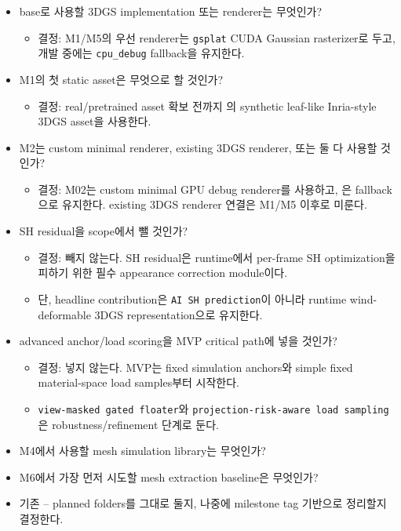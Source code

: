 \documentclass[10pt]{article}
\newcommand{\done}{\textcolor{DoneGreen}{\(\boxtimes\)}}
\newcommand{\code}[1]{\texttt{#1}}
\begin{document}
\begin{itemize}
  \item[\done] base로 사용할 3DGS implementation 또는 renderer는 무엇인가?
    \begin{itemize}
      \item 결정: M1/M5의 우선 renderer는 \code{gsplat} CUDA Gaussian rasterizer로 두고, 개발 중에는 \code{cpu\_debug} fallback을 유지한다.
    \end{itemize}
  \item[\done] M1의 첫 static asset은 무엇으로 할 것인가?
    \begin{itemize}
      \item 결정: real/pretrained asset 확보 전까지 의 synthetic leaf-like Inria-style 3DGS asset을 사용한다.
    \end{itemize}
  \item[\done] M2는 custom minimal renderer, existing 3DGS renderer, 또는 둘 다 사용할 것인가?
    \begin{itemize}
      \item 결정: M02는 custom minimal GPU debug renderer를 사용하고, 은 fallback으로 유지한다. existing 3DGS renderer 연결은 M1/M5 이후로 미룬다.
    \end{itemize}
  \item[\done] SH residual을 scope에서 뺄 것인가?
    \begin{itemize}
      \item 결정: 빼지 않는다. SH residual은 runtime에서 per-frame SH optimization을 피하기 위한 필수 appearance correction module이다.
      \item 단, headline contribution은 \code{AI SH prediction}이 아니라 runtime wind-deformable 3DGS representation으로 유지한다.
    \end{itemize}
  \item[\done] advanced anchor/load scoring을 MVP critical path에 넣을 것인가?
    \begin{itemize}
      \item 결정: 넣지 않는다. MVP는 fixed simulation anchors와 simple fixed material-space load samples부터 시작한다.
      \item \code{view-masked gated floater}와 \code{projection-risk-aware load sampling}은 robustness/refinement 단계로 둔다.
    \end{itemize}
  \item M4에서 사용할 mesh simulation library는 무엇인가?
  \item M6에서 가장 먼저 시도할 mesh extraction baseline은 무엇인가?
  \item 기존 -- planned folders를 그대로 둘지, 나중에 milestone tag 기반으로 정리할지 결정한다.
\end{itemize}
\end{document}

